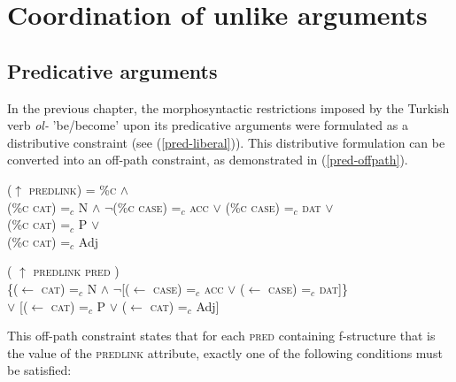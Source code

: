 \section{Coordination of unlike arguments}
\subsection{Predicative arguments}

In the previous chapter, the morphosyntactic restrictions imposed by the Turkish verb \textit{ol-} 'be/become' upon its predicative arguments were formulated as a distributive constraint (see (\ref{pred-liberal})). This distributive formulation can be converted into an off-path constraint, as demonstrated in (\ref{pred-offpath}).

\ex
\label{pred-liberal}
($\uparrow$ \textsc{predlink}) = \%\textsc{c} $\land$ \\
\vspace{3pt}\text{[[}(\%\textsc{c cat}) =$_c$ N $\land$ $\neg$\text{[}(\%\textsc{c case}) =$_c$ \textsc{acc} $\lor$ (\%\textsc{c case}) =$_c$ \textsc{dat}\text{]]} $\lor$ \\
(\%\textsc{c cat})  =$_c$ P $\lor$ \\
(\%\textsc{c cat})  =$_c$ Adj\text{]]}
\xe

\ex
\label{pred-offpath}
( $\uparrow$  \textsc{predlink} \hspace*{12em} \textsc{pred} \hspace*{12.8em}) \\
\hspace*{5.3em} \{($\leftarrow$ \textsc{cat}) =$_{c}$ N \hspace*{0.4em} $\land$ \hspace*{0.4em} $\neg$[($\leftarrow$ \textsc{case}) =$_{c}$ \textsc{acc} \hspace*{0.2em} $\lor$ \hspace*{0.2em} ($\leftarrow$ \textsc{case}) =$_{c}$ \textsc{dat}]\}
\\
\hspace*{9.5em} $\lor$ \hspace*{0.4em} [($\leftarrow$ \textsc{cat}) =$_{c}$ P \hspace*{0.4em} $\lor$ \hspace*{0.4em} ($\leftarrow$ \textsc{cat}) =$_{c}$ Adj]
\xe

This off-path constraint states that for each \textsc{pred} containing f-structure that is the value of the \textsc{predlink} attribute, exactly one of the following conditions must be satisfied:


